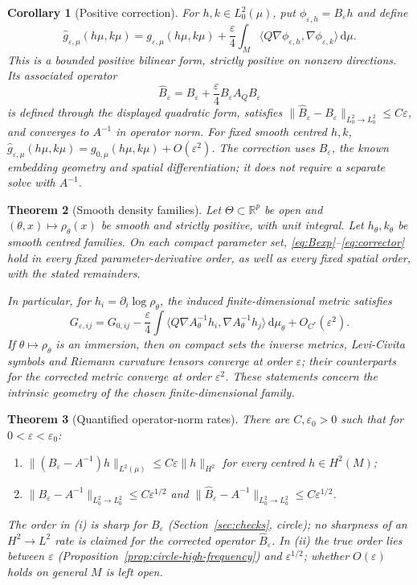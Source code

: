 \documentclass[11pt,a4paper]{article}
\newtheorem{theorem}{Theorem}[section]
\newtheorem{corollary}[theorem]{Corollary}
\theoremstyle{definition}\newtheorem{definition}[theorem]{Definition}
\theoremstyle{remark}\newtheorem{remark}[theorem]{Remark}
\newcommand{\eps}{\varepsilon}
\newcommand{\dd}{\,\mathrm d}
\newcommand{\R}{\mathbb R}
\newcommand{\norm}[1]{\lVert #1\rVert}
\begin{document}
\begin{corollary}[Positive correction]\label{cor:correction}
For $h,k\in L^2_0(\mu)$, put $\phi_{\eps,h}=B_\eps h$ and define
\begin{equation}\label{eq:corrector}
\widehat g_{\eps,\mu}(h\mu,k\mu)
=g_{\eps,\mu}(h\mu,k\mu)
+\frac{\eps}{4}\int_M\langle Q\nabla\phi_{\eps,h},\nabla\phi_{\eps,k}\rangle\dd\mu.
\end{equation}
This is a bounded positive bilinear form, strictly positive on nonzero directions. Its associated operator
\[
\widehat B_\eps=B_\eps+\frac\eps4 B_\eps A_QB_\eps
\]
is defined through the displayed quadratic form, satisfies $\norm{\widehat B_\eps-B_\eps}_{L^2_0\to L^2_0}\leq C\eps$, and converges to $A^{-1}$ in operator norm. For fixed smooth centred $h,k$,
$\widehat g_{\eps,\mu}(h\mu,k\mu)=g_{0,\mu}(h\mu,k\mu)+O(\eps^2)$.
The correction uses $B_\eps$, the known embedding geometry and spatial differentiation; it does not require a separate solve with $A^{-1}$.
\end{corollary}

\begin{theorem}[Smooth density families]\label{thm:families}
Let $\Theta\subset\R^p$ be open and $(\theta,x)\mapsto\rho_\theta(x)$ be smooth and strictly positive, with unit integral. Let $h_\theta,k_\theta$ be smooth centred families. On each compact parameter set, \eqref{eq:Bexp}--\eqref{eq:corrector} hold in every fixed parameter-derivative order, as well as every fixed spatial order, with the stated remainders.

In particular, for $h_i=\partial_i\log\rho_\theta$, the induced finite-dimensional metric satisfies
\[
G_{\eps,ij}=G_{0,ij}-\frac{\eps}{4}
\int\langle Q\nabla A_\theta^{-1}h_i,\nabla A_\theta^{-1}h_j\rangle\dd\mu_\theta
+O_{C^r}(\eps^2).
\]
If $\theta\mapsto\rho_\theta$ is an immersion, then on compact sets the inverse metrics, Levi-Civita symbols and Riemann curvature tensors converge at order $\eps$; their counterparts for the corrected metric converge at order $\eps^2$. These statements concern the intrinsic geometry of the chosen finite-dimensional family.
\end{theorem}

\begin{theorem}[Quantified operator-norm rates]\label{thm:rate}
There are $C,\eps_0>0$ such that for $0<\eps<\eps_0$:
\begin{enumerate}[label=(\roman*),leftmargin=2em]
\item $\norm{(B_\eps-A^{-1})h}_{L^2(\mu)}\leq C\eps\norm{h}_{H^2}$ for every centred $h\in H^2(M)$;
\item $\norm{B_\eps-A^{-1}}_{L^2_0\to L^2_0}\leq C\eps^{1/2}$ and $\norm{\widehat B_\eps-A^{-1}}_{L^2_0\to L^2_0}\leq C\eps^{1/2}$.
\end{enumerate}
The order in (i) is sharp for $B_\eps$ (Section~\ref{sec:checks}, circle); no sharpness of an $H^2\to L^2$ rate is claimed for the corrected operator $\widehat B_\eps$. In (ii) the true order lies between $\eps$ (Proposition~\ref{prop:circle-high-frequency}) and $\eps^{1/2}$; whether $O(\eps)$ holds on general $M$ is left open.
\end{theorem}
\end{document}
